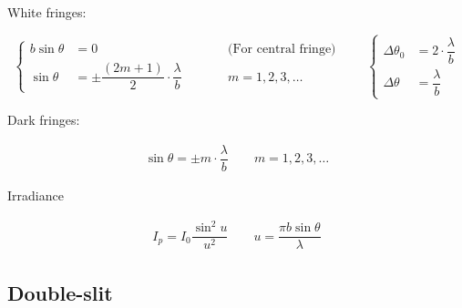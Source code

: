White fringes:

\begin{equation*}
  \left\{
    \begin{aligned}
      b \sin \theta &= 0 && \quad\quad \text{(For central fringe)} \\
      \sin \theta &= \pm \dfrac{\left( 2 m + 1 \right)}{2} \cdot \dfrac{\lambda}{b} && \quad\quad m = 1,2,3,\dots
    \end{aligned}
  \right.
  \quad\quad 
  \left\{
    \begin{aligned}
      \Delta \theta_0 &= 2 \cdot \dfrac{\lambda}{b} \\
      \Delta \theta &= \dfrac{\lambda}{b} 
    \end{aligned}
  \right.
\end{equation*}

Dark fringes:

\begin{equation*}
  \begin{aligned}
    \sin \theta = \pm m \cdot \dfrac{\lambda}{b} \quad\quad m = 1,2,3,\dots
  \end{aligned}
\end{equation*}

Irradiance

\begin{equation*}
  \begin{aligned}
    I_p = I_0 \dfrac{\sin^2 u}{u^2}
    \quad\quad
    u = \dfrac{\pi b \sin \theta}{\lambda} 
  \end{aligned}
\end{equation*}

\subsection{Double-slit}

